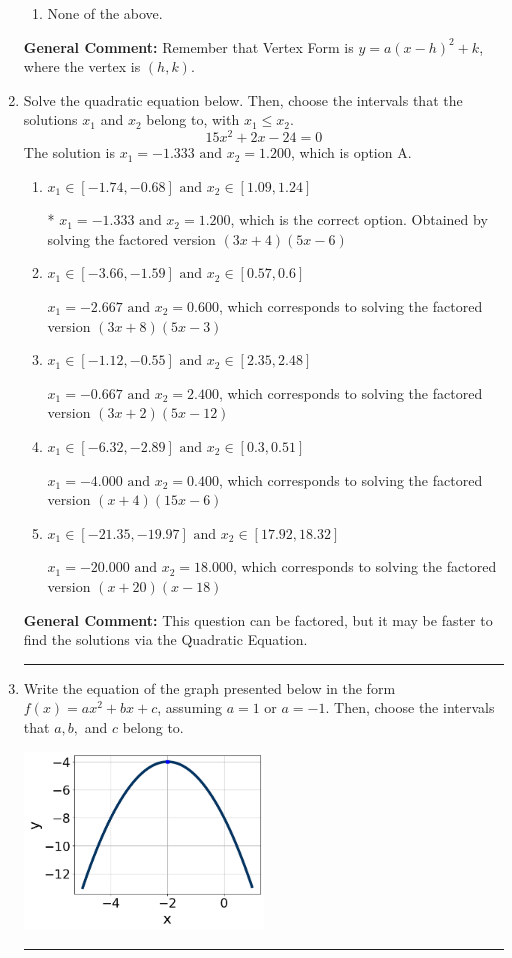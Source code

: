 \documentclass{extbook}[14pt]
\newcommand{\litem}[1]{\item #1

\rule{\textwidth}{0.4pt}}
\begin{document}
\begin{enumerate}
{\begin{enumerate}[label=\Alph*.]
\begin{multicols}{2}
\end{multicols}\item None of the above.\end{enumerate}
\textbf{General Comment:} Remember that Vertex Form is $y = a(x-h)^2+k$, where the vertex is $(h, k)$.
}
\litem{
Solve the quadratic equation below. Then, choose the intervals that the solutions $x_1$ and $x_2$ belong to, with $x_1 \leq x_2$.
\[ 15x^{2} +2 x -24 = 0 \]The solution is \( x_1 = -1.333 \text{ and } x_2 = 1.200 \), which is option A.\begin{enumerate}[label=\Alph*.]
\item \( x_1 \in [-1.74, -0.68] \text{ and } x_2 \in [1.09, 1.24] \)

* $x_1 = -1.333 \text{ and } x_2 = 1.200$, which is the correct option. Obtained by solving the factored version $(3x + 4)(5x -6)$
\item \( x_1 \in [-3.66, -1.59] \text{ and } x_2 \in [0.57, 0.6] \)

$x_1 = -2.667 \text{ and } x_2 = 0.600$, which corresponds to solving the factored version $(3x + 8)(5x -3)$
\item \( x_1 \in [-1.12, -0.55] \text{ and } x_2 \in [2.35, 2.48] \)

$x_1 = -0.667 \text{ and } x_2 = 2.400$, which corresponds to solving the factored version $(3x + 2)(5x -12)$
\item \( x_1 \in [-6.32, -2.89] \text{ and } x_2 \in [0.3, 0.51] \)

$x_1 = -4.000 \text{ and } x_2 = 0.400$, which corresponds to solving the factored version $(x + 4)(15x -6)$
\item \( x_1 \in [-21.35, -19.97] \text{ and } x_2 \in [17.92, 18.32] \)

$x_1 = -20.000 \text{ and } x_2 = 18.000$, which corresponds to solving the factored version $(x + 20)(x -18)$
\end{enumerate}

\textbf{General Comment:} This question can be factored, but it may be faster to find the solutions via the Quadratic Equation.
}
\litem{
Write the equation of the graph presented below in the form $f(x)=ax^2+bx+c$, assuming  $a=1$ or $a=-1$. Then, choose the intervals that $a, b,$ and $c$ belong to.

\begin{center}
    \includegraphics[width=0.5\textwidth]{../Figures/quadraticGraphToEquationCopyB.png}
\end{center}


}
\end{enumerate}
\end{document}
